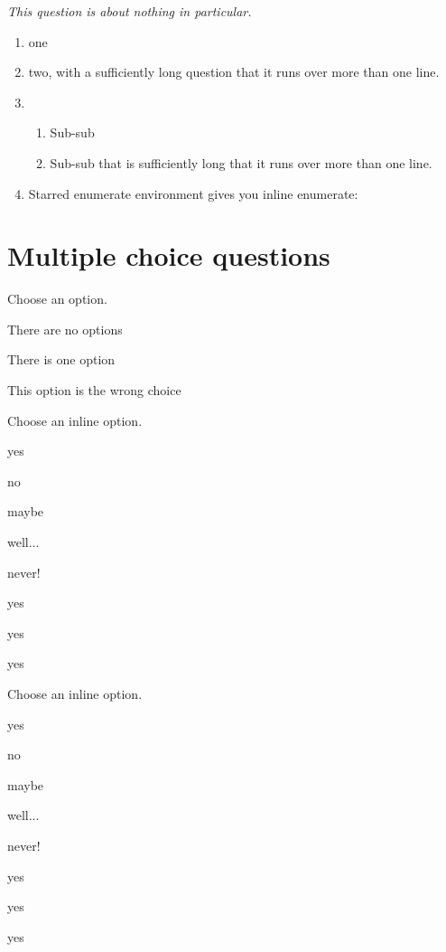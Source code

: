 \documentclass{ouexam}
\begin{document}
\question
\emph{This question is about nothing in particular.}
\begin{enumerate}
\item one
\item two, with a sufficiently long question that it runs over more than one line.
\item 
\begin{enumerate}
\item Sub-sub
\item Sub-sub that is sufficiently long that it runs over more than one line.
\end{enumerate}
\item Starred enumerate environment gives you inline enumerate:
\end{enumerate}

\section{Multiple choice questions}


\question
Choose an option.
\begin{options}
\item There are no options
\item There is one option
\item This option is the wrong choice
\end{options}


\question
Choose an inline option.
\begin{inlineoptions}{5} %
\item yes
\item no
\item maybe
\item well...
\item never!
\item yes
\item yes
\item yes
\noitem %
\noitem{}
\end{inlineoptions}

\question
Choose an inline option.
\begin{inlineoptions}[1.5]{3} %
\item yes
\item no
\item maybe
\item well...
\item never!
\item yes
\item yes
\item yes
\noitem %
\end{inlineoptions}
\end{document}
